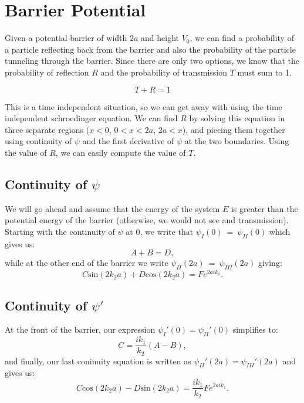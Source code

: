 \section{Barrier Potential}

Given a potential barrier of width $2a$ and height $V_0$, we can find a probability of a particle reflecting back from the barrier and also the probability of the particle tunneling through the barrier. Since there are only two options, we know that the probability of reflection $R$ and the probability of transmission $T$ must sum to 1.

$$T + R = 1$$

This is a time independent situation, so we can get away with using the time independent schroedinger equation. We can find $R$ by solving this equation in three separate regions ($x < 0$, $0 < x < 2a$, $2a < x$), and piecing them together using continuity of $\psi$ and the first derivative of $\psi$ at the two boundaries. Using the value of $R$, we can easily compute the value of $T$. 

\subsection{Continuity of $\psi$}

We will go ahead and assume that the energy of the system $E$ is greater than the potential energy of the barrier (otherwise, we would not see and transmission). Starting with the continuity of $\psi$ at 0, we write that $\psi_I(0)~=~\psi_{II}(0)$ which gives us:  
\begin{equation}
A + B = D,
\label{front}
\end{equation}
while at the other end of the barrier we write $\psi_{II}(2a)~=~\psi_{III}(2a)$ giving:
\begin{equation}
C \mathrm{sin}(2 k_2 a) + D \mathrm{cos}(2 k_2 a) = F e^{2a i k_1}.
\label{end}
\end{equation}



\subsection{Continuity of $\psi'$}

At the front of the barrier, our expression $\psi_I'(0) = \psi_{II}'(0)$ simplifies to:
\begin{equation}
C = \frac{i k_1}{k_2}(A-B),
\label{frontp}
\end{equation}
and finally, our last coninuity equation is written as $\psi_{II}'(2a) = \psi_{III}'(2a)$ and gives us:  
\begin{equation}
C \mathrm{cos}(2 k_2 a) - D \mathrm{sin}(2 k_2 a) =\frac{i k_1}{k_2} F e^{2a i k_1}.
\label{endp}
\end{equation}
 
